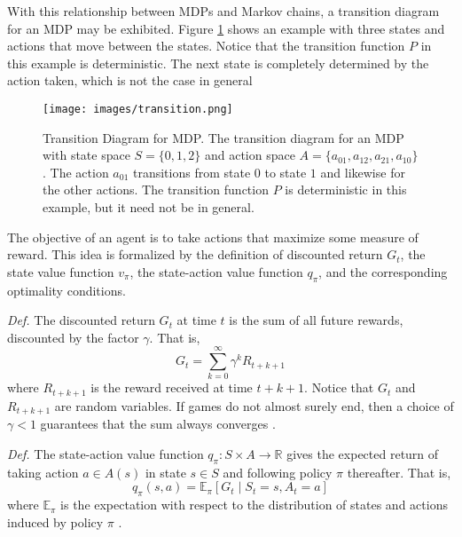 \documentclass[final,5p,times,twocolumn]{elsarticle}
\begin{document}
With this relationship between MDPs and Markov chains, a transition diagram for an MDP may be exhibited. Figure \ref{fig:trans} shows an example with three states and actions that move between the states. Notice that the transition function $P$ in this example is deterministic. The next state is completely determined by the action taken, which is not the case in general \cite{sutton1998reinforcement}

\begin{figure}[h!]
    \centering
    \texttt{[image: images/transition.png]}
    \caption{Transition Diagram for MDP. The transition diagram for an MDP with state space $S = \{0, 1, 2\}$ and action space $A = \{a_{01}, a_{12}, a_{21}, a_{10}\}$. The action $a_{01}$ transitions from state $0$ to state $1$ and likewise for the other actions. The transition function $P$ is deterministic in this example, but it need not be in general.}
    \label{fig:trans}
\end{figure}

The objective of an agent is to take actions that maximize some measure of reward. This idea is formalized by the definition of discounted return $G_{t}$, the state value function $v_{\pi}$, the state-action value function $q_{\pi}$, and the corresponding optimality conditions.

\textit{Def.} The discounted return $G_{t}$ at time $t$ is the sum of all future rewards, discounted by the factor $\gamma$. That is,
$$G_{t} = \sum_{k=0}^{\infty} \gamma^{k} R_{t+k+1}$$
where $R_{t+k+1}$ is the reward received at time $t+k+1$. Notice that $G_{t}$ and $R_{t+k+1}$ are random variables. If games do not almost surely end, then a choice of $\gamma < 1$ guarantees that the sum always converges \cite{sutton1998reinforcement}.


\textit{Def.} The state-action value function $q_{\pi}: S \times A \to \mathbb{R}$ gives the expected return of taking action $a \in A(s)$ in state $s \in S$ and following policy $\pi$ thereafter. That is,
$$q_{\pi}(s, a) = \mathbb{E}_{\pi} \left[ G_{t} \mid S_{t} = s, A_{t} = a \right]$$
where $\mathbb{E}_{\pi}$ is the expectation with respect to the distribution of states and actions induced by policy $\pi$ \cite{sutton1998reinforcement}.
\end{document}
